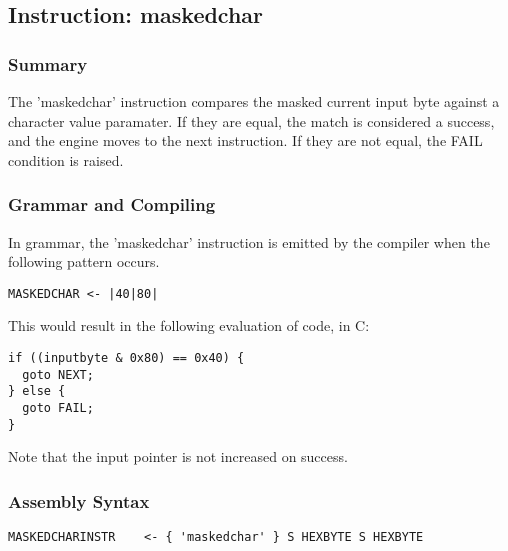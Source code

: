 \subsection{Instruction: maskedchar}

\subsubsection{Summary}

The 'maskedchar' instruction compares the masked current input byte
against a character value paramater.
If they are
equal, the match is considered a success, and the engine moves to the
next instruction. If they are not equal, the FAIL condition is raised.

\subsubsection{Grammar and Compiling}

In grammar, the 'maskedchar' instruction is emitted by the compiler
when the following pattern occurs.

\begin{myquote}
\begin{verbatim}
MASKEDCHAR <- |40|80|

\end{verbatim}
\end{myquote}

This would result in the following evaluation of code, in C:

\begin{myquote}
\begin{verbatim}
if ((inputbyte & 0x80) == 0x40) {
  goto NEXT;
} else {
  goto FAIL;
}

\end{verbatim}
\end{myquote}

Note that the input pointer is not increased on success.

\subsubsection{Assembly Syntax}

\begin{myquote}
\begin{verbatim}
MASKEDCHARINSTR    <- { 'maskedchar' } S HEXBYTE S HEXBYTE

\end{verbatim}
\end{myquote}


